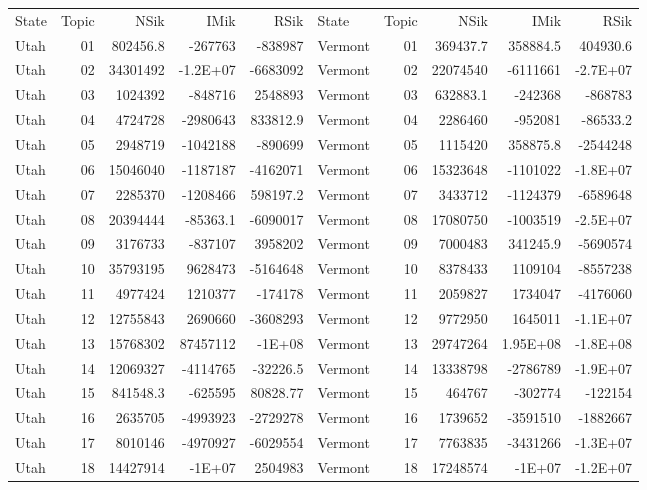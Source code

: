 \begin{table}[]
	\footnotesize
	\begin{tabular}{lrrrrlrrrr}
	State & Topic & NSik & IMik & RSik & State & Topic & NSik & IMik & RSik \\
		Utah &  01  & 802456.8 & -267763 & -838987 & Vermont &  01  & 369437.7 & 358884.5 & 404930.6 \\
		Utah &  02  & 34301492 & -1.2E+07 & -6683092 & Vermont &  02  & 22074540 & -6111661 & -2.7E+07 \\
		Utah &  03  & 1024392 & -848716 & 2548893 & Vermont &  03  & 632883.1 & -242368 & -868783 \\
		Utah &  04  & 4724728 & -2980643 & 833812.9 & Vermont &  04  & 2286460 & -952081 & -86533.2 \\
		Utah &  05  & 2948719 & -1042188 & -890699 & Vermont &  05  & 1115420 & 358875.8 & -2544248 \\
		Utah &  06  & 15046040 & -1187187 & -4162071 & Vermont &  06  & 15323648 & -1101022 & -1.8E+07 \\
		Utah &  07  & 2285370 & -1208466 & 598197.2 & Vermont &  07  & 3433712 & -1124379 & -6589648 \\
		Utah &  08  & 20394444 & -85363.1 & -6090017 & Vermont &  08  & 17080750 & -1003519 & -2.5E+07 \\
		Utah &  09  & 3176733 & -837107 & 3958202 & Vermont &  09  & 7000483 & 341245.9 & -5690574 \\
		Utah &  10 & 35793195 & 9628473 & -5164648 & Vermont &  10 & 8378433 & 1109104 & -8557238 \\
		Utah &  11 & 4977424 & 1210377 & -174178 & Vermont &  11 & 2059827 & 1734047 & -4176060 \\
		Utah &  12 & 12755843 & 2690660 & -3608293 & Vermont &  12 & 9772950 & 1645011 & -1.1E+07 \\
		Utah &  13 & 15768302 & 87457112 & -1E+08 & Vermont &  13 & 29747264 & 1.95E+08 & -1.8E+08 \\
		Utah &  14 & 12069327 & -4114765 & -32226.5 & Vermont &  14 & 13338798 & -2786789 & -1.9E+07 \\
		Utah &  15 & 841548.3 & -625595 & 80828.77 & Vermont &  15 & 464767 & -302774 & -122154 \\
		Utah &  16 & 2635705 & -4993923 & -2729278 & Vermont &  16 & 1739652 & -3591510 & -1882667 \\
		Utah &  17 & 8010146 & -4970927 & -6029554 & Vermont &  17 & 7763835 & -3431266 & -1.3E+07 \\
		Utah &  18 & 14427914 & -1E+07 & 2504983 & Vermont &  18 & 17248574 & -1E+07 & -1.2E+07 \\

\end{tabular}
\end{table}
